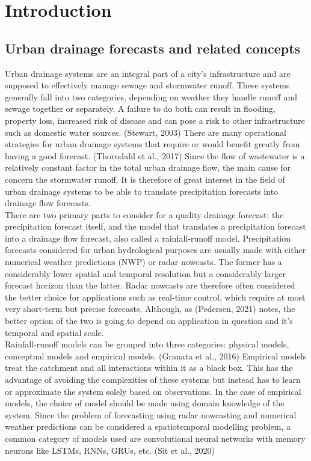 \chapter{Introduction}

\section{Urban drainage forecasts and related concepts}
Urban drainage systems are an integral part of a city’s infrastructure and are supposed to effectively manage sewage and stormwater runoff. These systems generally fall into two categories, depending on weather they handle runoff and sewage together or separately. A failure to do both can result in flooding, property loss, increased risk of disease and can pose a risk to other infrastructure such as domestic water sources. (Stewart, 2003) There are many operational strategies for urban drainage systems that require or would benefit greatly from having a good forecast. (Thorndahl et al., 2017) Since the flow of wastewater is a relatively constant factor in the total urban drainage flow, the main cause for concern the stormwater runoff. It is therefore of great interest in the field of urban drainage systems to be able to translate precipitation forecasts into drainage flow forecasts.\\
There are two primary parts to consider for a quality drainage forecast: the precipitation forecast itself, and the model that translates a precipitation forecast into a drainage flow forecast, also called a rainfall-runoff model. Precipitation forecasts considered for urban hydrological purposes are usually made with either numerical weather predictions (NWP) or radar nowcasts. The former has a considerably lower spatial and temporal resolution but a considerably larger forecast horizon than the latter. Radar nowcasts are therefore often considered the better choice for applications such as real-time control, which require at most very short-term but precise forecasts. Although, as (Pedersen, 2021) notes, the better option of the two is going to depend on application in question and it’s temporal and spatial scale. \\
Rainfall-runoff models can be grouped into three categories: physical models, conceptual models and empirical models. (Granata et al., 2016) Empirical models treat the catchment and all interactions within it as a black box. This has the advantage of avoiding the complexities of these systems but instead has to learn or approximate the system solely based on observations. In the case of empirical models, the choice of model should be made using domain knowledge of the system. Since the problem of forecasting using radar nowcasting and numerical weather predictions can be considered a spatiotemporal modelling problem, a common category of models used are convolutional neural networks with memory neurons like LSTMs, RNNs, GRUs, etc. (Sit et al., 2020) \\
